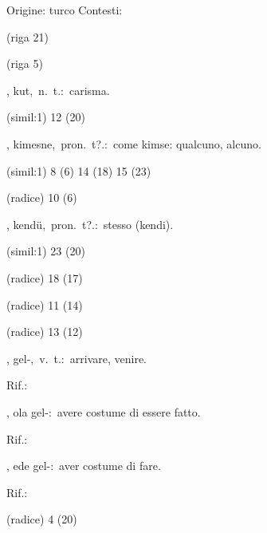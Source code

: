 \begin{glossario}{Origine: turco}
Contesti:
\begin{subvocedue}
\item[(riga 21)] 
\item[(riga 5)] 
\end{subvocedue}
\item[{\color{colorlowref}\spzrl{q.Ut}},] {\sf kut},\ n.\ t.:\ carisma.
\begin{subvocedue}
\item[(simil:1)]   12 (20)
\end{subvocedue}
\item[{\color{colorlowref}\spzrl{kimesn.H}},] {\sf kimesne},\ pron.\ t?.:\ come kimse: qualcuno, alcuno.
\begin{subvocedue}
\item[(simil:1)]   8 (6) 14 (18) 15 (23)
\item[(radice)]   10 (6)
\end{subvocedue}
\item[{\color{colorlowref}\spzrl{kend:U}},] {\sf kendü},\ pron.\ t?.:\ stesso (kendi).
\begin{subvocedue}
\item[(simil:1)]   23 (20)
\item[(radice)]   18 (17)
\item[(radice)]   11 (14)
\item[(radice)]   13 (12)
\end{subvocedue}
\item[{\color{colorlowref}\spzrl{g:alB}},] {\sf gel-},\ v.\ t.:\ arrivare, venire.
\begin{subvocedue}
\item[Rif.:] 
\end{subvocedue}
\begin{subvocedue}
\item[\subglossariobullet] , {\sf ola gel-}:\ avere costume di essere fatto.
\begin{subvocedue}
\item[Rif.:] 
\end{subvocedue}
\item[\subglossariobullet] , {\sf ede gel-}:\ aver costume di fare.
\begin{subvocedue}
\item[Rif.:] 
\end{subvocedue}
\item[(radice)]   4 (20)
\end{subvocedue}



\end{glossario}
